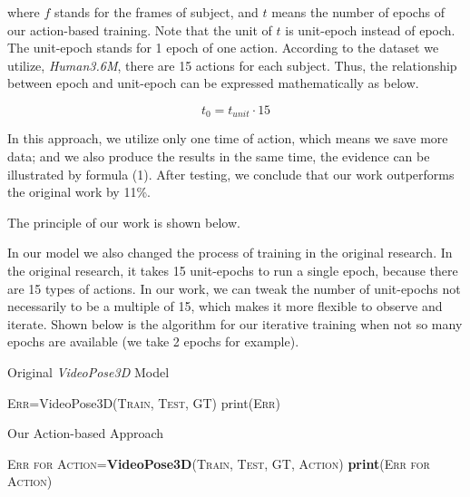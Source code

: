 \documentclass[10pt,twocolumn,letterpaper]{article}
\begin{document}
where $f$ stands for the frames of subject, and $t$ means the number of epochs of our action-based 
training. Note that the unit of $t$ is unit-epoch instead of epoch. The unit-epoch stands for 1 epoch
of one action. According to the dataset we utilize, \textit{Human3.6M}, there are 15 actions for each
subject. Thus, the relationship between epoch and unit-epoch can be expressed mathematically as below.

\begin{equation}
	t_0 = t_{unit}\cdot 15
\end{equation}


In this approach, we utilize only one time of action, which means we save more data; and we also produce
the results in the same time, the evidence can be illustrated by formula (1). After testing, we conclude 
that our work outperforms the original work by 11\%.

The principle of our work is shown below.

In our model we also changed the process of training in the original research. In the original research,
it takes 15 unit-epochs to run a single epoch, because there are 15 types of actions. In our work, we can
tweak the number of unit-epochs not necessarily to be a multiple of 15, which makes it more flexible to 
observe and iterate. Shown below is the algorithm for our iterative training when not so many epochs are 
available (we take 2 epochs for example).


\begin{algorithm}
  \caption{Original \textit{VideoPose3D} Model}
  \SetAlgoLined
  
  
  	{
 		\textsc{Err}=VideoPose3D(\textsc{Train, Test, GT})\;
  		print(\textsc{Err})\;
  		
  	}
  
 \;
\end{algorithm}

\begin{algorithm}
  \caption{Our Action-based Approach}
  \SetAlgoLined
  
  
  	{
 		\textsc{Err for Action}=\textbf{VideoPose3D}(\textsc{Train, Test, GT, Action})\;
  		\textbf{print}(\textsc{Err for Action})\;
  		
  	}
  
 \;
\end{algorithm}
\end{document}
